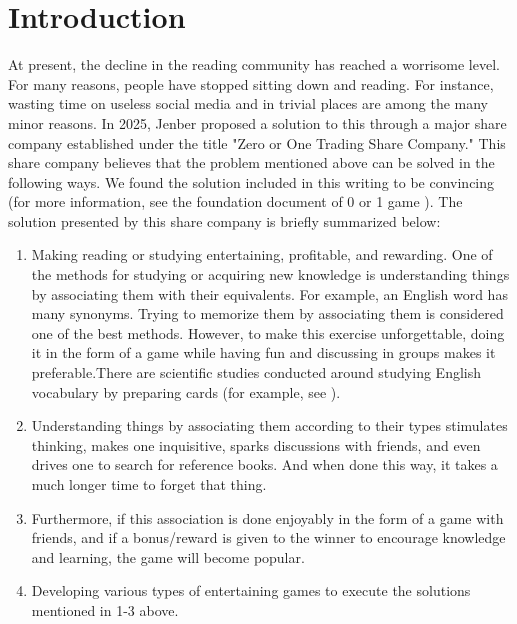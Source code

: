 \documentclass[a4paper,12pt]{article}
\theoremstyle{mystyle}
\numberwithin{equation}{section}
\numberwithin{theorem}{section}
\numberwithin{proposition}{section}
\numberwithin{example}{section}
\numberwithin{remark}{section}
\numberwithin{lemma}{section}
\numberwithin{corollary}{section}
\numberwithin{definition}{section}
\begin{document}
\section{Introduction}
\label{S:2}
At present, the decline in the reading community has reached a worrisome level. For many reasons, people have stopped sitting down and reading. For instance, wasting time on useless social media and in trivial places are among the many minor reasons. In 2025, Jenber proposed a solution to this through a major share company established under the title "Zero or One Trading Share Company." This share company believes that the problem mentioned above can be solved in the following ways. We found the solution included in this writing to be convincing (for more information, see the foundation document of 0 or 1 game \cite{ZOOTSC}). The solution presented by this share company is briefly summarized below:
\begin{enumerate}\item[(1)] Making reading or studying entertaining, profitable, and rewarding. One of the methods for studying or acquiring new knowledge is understanding things by associating them with their equivalents. For example, an English word has many synonyms. Trying to memorize them by associating them is considered one of the best methods. However, to make this exercise unforgettable, doing it in the form of a game while having fun and discussing in groups makes it preferable.There are scientific studies conducted around studying English vocabulary by preparing cards (for example, see \cite{aslan2011teaching,azabdaftari2012comparing,bryson2012using,kosim2013improving,nikoopour2014vocabulary,nugroho2012improving,saputri2017improving,senzaki2017reinventing,sitompul2013teaching,wahyuni2014flashcards}).
\item[(2)] Understanding things by associating them according to their types stimulates thinking, makes one inquisitive, sparks discussions with friends, and even drives one to search for reference books. And when done this way, it takes a much longer time to forget that thing.
\item[(3)] Furthermore, if this association is done enjoyably in the form of a game with friends, and if a bonus/reward is given to the winner to encourage knowledge and learning, the game will become popular.
\item[(4)] Developing various types of entertaining games to execute the solutions mentioned in 1-3 above.
\end{enumerate}
\end{document}

